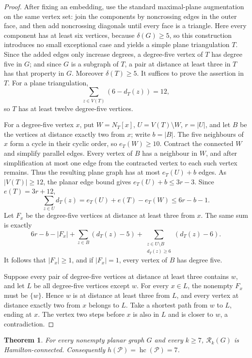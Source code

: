 \documentclass[11pt]{article}
\newtheorem{theorem}{Theorem}[section]
\theoremstyle{remark}
\newcommand{\Rk}{\mathcal R_k}
\newcommand{\hc}{\operatorname{hc}}
\numberwithin{equation}{section}
\numberwithin{table}{section}
\begin{document}
\begin{proof}
After fixing an embedding, use the standard maximal-plane augmentation
on the same vertex set: join the components by noncrossing edges in the
outer face, and then add noncrossing diagonals until every face is a
triangle.  Here every component has at least six vertices, because
$\delta(G)\ge5$, so this construction introduces no small exceptional
case and yields a simple plane triangulation $T$.  Since the added edges
only increase degrees, a degree-five vertex of $T$ has degree five in
$G$; and since $G$ is a subgraph of $T$, a pair at distance at least
three in $T$ has that property in $G$.  Moreover $\delta(T)\ge5$.  It
suffices to prove the assertion in $T$.  For a plane triangulation,
\[
\sum_{z\in V(T)}(6-d_T(z))=12,
\]
so $T$ has at least twelve degree-five vertices.

For a degree-five vertex $x$, put $W=N_T[x]$, $U=V(T)\setminus W$,
$r=|U|$, and let $B$ be the vertices at distance exactly two from $x$;
write $b=|B|$.  The five neighbours of $x$ form a cycle in their cyclic
order, so $e_T(W)\ge10$.  Contract the connected $W$ and simplify
parallel edges.  Every vertex of $B$ has a neighbour in $W$, and after
simplification at most one edge from the contracted vertex to each such
vertex remains.  Thus the resulting plane graph has at most
$e_T(U)+b$ edges.  As $|V(T)|\ge12$, the planar edge bound gives
$e_T(U)+b\le3r-3$.  Since $e(T)=3r+12$,
\[
 \sum_{z\in U}d_T(z)
 =e_T(U)+e(T)-e_T(W)\le6r-b-1.
\]
Let $F_x$ be the degree-five vertices at distance at least three from
$x$.  The same sum is exactly
\[
 6r-b-|F_x|
 +\sum_{z\in B}(d_T(z)-5)
 +\sum_{\substack{z\in U\setminus B\\ d_T(z)\ge6}}(d_T(z)-6).
\]
It follows that $|F_x|\ge1$, and if $|F_x|=1$, every vertex of $B$
has degree five.

Suppose every pair of degree-five vertices at distance at least three
contains $w$, and let $L$ be all degree-five vertices except $w$.
For every $x\in L$, the nonempty $F_x$ must be $\{w\}$.  Hence
$w$ is at distance at least three from $L$, and every vertex at distance
exactly two from $x$ belongs to $L$.  Take a shortest path from $w$
to $L$, ending at $x$.  The vertex two steps before $x$ is also in
$L$ and is closer to $w$, a contradiction.
\end{proof}

\begin{theorem}
\label{thm:planar-hc}
For every nonempty planar graph $G$ and every $k\ge7$, $\Rk(G)$ is
Hamilton-connected.  Consequently
$h(\mathcal P)=\hc(\mathcal P)=7$.
\end{theorem}
\end{document}
